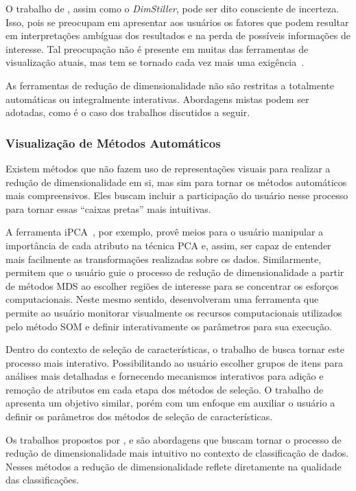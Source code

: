 O trabalho de \citet{Johansson2009}, assim como o
\emph{DimStiller}, pode ser dito consciente de incerteza.
Isso, pois se preocupam em apresentar aos usuários os fatores que
podem resultar em interpretações ambíguas dos resultados e
na perda de possíveis informações de interesse. 
Tal preocupação não é presente em muitas das ferramentas de
visualização atuais, mas tem se tornado cada vez mais uma
exigência~\cite{Dill2012}.

As ferramentas de redução de dimensionalidade não são
restritas a totalmente automáticas ou integralmente
interativas. Abordagens mistas podem ser adotadas, como é o
caso dos trabalhos discutidos a seguir.

\subsubsection{Visualização de Métodos Automáticos}

Existem métodos que não fazem uso de representações
visuais para realizar a redução de dimensionalidade em si,
mas sim para tornar os métodos automáticos mais
compreensivos. Eles buscam incluir a participação do usuário
nesse processo para tornar essas ``caixas pretas'' mais
intuitivas. 

A ferramenta iPCA~\cite{Jeong2009}, por exemplo, provê meios
para o usuário manipular a importância de cada atributo na
técnica PCA e, assim, ser capaz de entender mais facilmente as
transformações realizadas sobre os dados. Similarmente,
\citet{Williams2004} permitem que o usuário guie o processo
de redução de dimensionalidade a partir de métodos MDS ao
escolher regiões de interesse para se concentrar os esforços
computacionais.  Neste mesmo sentido, \citet{Schreck2008}
desenvolveram uma ferramenta que permite ao usuário
monitorar visualmente os recursos computacionais utilizados
pelo método SOM e definir interativamente os parâmetros para
sua execução.

Dentro do contexto de seleção de características, o trabalho
de \citet{Dy2000} busca tornar este processo mais interativo.
Possibilitando ao usuário escolher grupos de itens para
análises mais detalhadas e fornecendo mecanismos interativos
para adição e remoção de atributos em cada etapa dos métodos
de seleção. O trabalho de \citet{Brandoli2010} apresenta um
objetivo similar, porém com um enfoque em auxiliar o
usuário a definir os parâmetros dos métodos de seleção de
características.

Os trabalhos propostos por \citet{Zhang2006}, \citet{Choo2010}
e \citet{Paiva2012} são abordagens que buscam tornar o
processo de redução de dimensionalidade mais intuitivo no
contexto de classificação de dados. Nesses métodos a redução
de dimensionalidade reflete diretamente na qualidade das
classificações. 


